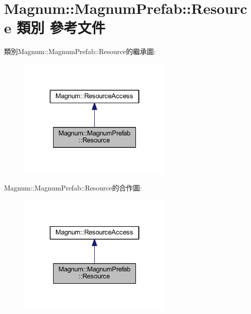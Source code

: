 \hypertarget{class_magnum_1_1_magnum_prefab_1_1_resource}{}\section{Magnum\+:\+:Magnum\+Prefab\+:\+:Resource 類別 參考文件}
\label{class_magnum_1_1_magnum_prefab_1_1_resource}


類別\+Magnum\+:\+:Magnum\+Prefab\+:\+:Resource的繼承圖\+:\nopagebreak
\begin{figure}[H]
\begin{center}
\leavevmode
\includegraphics[width=214pt]{class_magnum_1_1_magnum_prefab_1_1_resource__inherit__graph}
\end{center}
\end{figure}


Magnum\+:\+:Magnum\+Prefab\+:\+:Resource的合作圖\+:\nopagebreak
\begin{figure}[H]
\begin{center}
\leavevmode
\includegraphics[width=214pt]{class_magnum_1_1_magnum_prefab_1_1_resource__coll__graph}
\end{center}
\end{figure}
